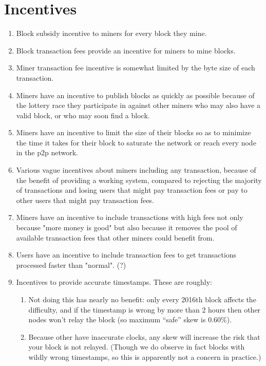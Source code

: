 \documentclass[letterpaper]{article}
\begin{document}
\section{Incentives}

\begin{enumerate}
\item Block subsidy incentive to miners for every block they mine.

\item Block transaction fees provide an incentive for miners to mine blocks.

\item Miner transaction fee incentive is somewhat limited by the byte size of
each transaction.

\item Miners have an incentive to publish blocks as quickly as possible because
of the lottery race they participate in against other miners who may also have
a valid block, or who may soon find a block.

\item Miners have an incentive to limit the size of their blocks so as to
minimize the time it takes for their block to saturate the network or reach
every node in the p2p network.

\item Various vague incentives about miners including any transaction, because
of the benefit of providing a working system, compared to rejecting the
majority of transactions and losing users that might pay transaction fees or
pay to other users that might pay transaction fees.

\item Miners have an incentive to include transactions with high fees not only
because "more money is good" but also because it removes the pool of available
transaction fees that other miners could benefit from.

\item Users have an incentive to include transaction fees to get transactions
processed faster than "normal". (?)

\item Incentives to provide accurate timestamps. These are roughly:
\begin{enumerate}
\item Not doing this has nearly no benefit: only every 2016th block affects the
difficulty, and if the timestamp is wrong by more than 2 hours then other nodes
won't relay the block (so maximum ``safe'' skew is 0.60\%).
\item Because other have inaccurate clocks, any skew will increase the risk that
your block is not relayed. (Though we do observe in fact blocks with wildly wrong
timestamps, so this is apparently not a concern in practice.)
\end{enumerate}


\end{enumerate}
\end{document}
